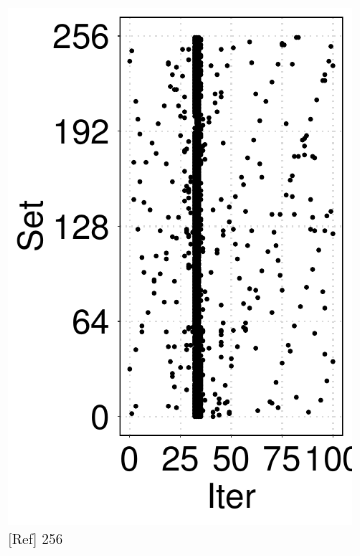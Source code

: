 
\begin{figure}[t]
    \centering
    \begin{subfigure}[b]{.24\linewidth}
        \centering
        \includegraphics[width=\linewidth]{figure/plot/reference/fig14-pmdk-kv-memory-pattern-256.tikz.pdf}
        \caption{[Ref] 256}
        \label{fig:14:ref:pmdk-kv-memory-pattern1}
    \end{subfigure}
    \hfill
    \begin{subfigure}[b]{.24\linewidth}
        \centering

\end{subfigure}
\end{figure}
